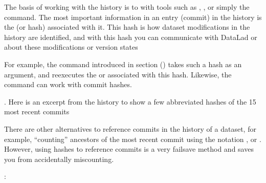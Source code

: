 \enlargethispage{\baselineskip}
\sphinxAtStartPar
The basis of working with the history is to  with tools such
as {\hyperref[\detokenize{glossary:term-tig}]{}}, {\hyperref[\detokenize{glossary:term-gitk}]{}}, or simply the  command.
The most important information in an entry (commit) in the history is
the {\hyperref[\detokenize{glossary:term-shasum}]{}} (or hash) associated with it.
This hash is how dataset modifications in the history are identified,
and with this hash you can communicate with DataLad or {\hyperref[\detokenize{glossary:term-Git}]{}} about these
modifications or version states%
\begin{footnote}\sphinxAtStartFootnote
For example, the  command introduced in section
{\hyperref[\detokenize{basics/101-109-rerun:run2}]{}} () takes such a hash as an argument, and re\sphinxhyphen{}executes
the  or  {\hyperref[\detokenize{glossary:term-run-record}]{}} associated with
this hash. Likewise, the  command can work with commit hashes.
%
\end{footnote}.
Here is an excerpt from the  history to show a
few abbreviated hashes of the 15 most recent commits%
\begin{footnote}\sphinxAtStartFootnote
There are other alternatives to reference commits in the history of a dataset,
for example, “counting” ancestors of the most recent commit using the notation
,  or . However, using hashes to reference
commits is a very fail\sphinxhyphen{}save method and saves you from accidentally miscounting.
%
\end{footnote}:

